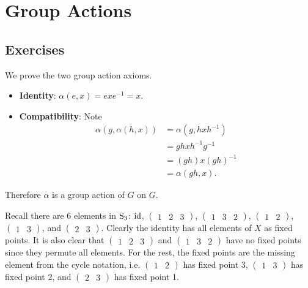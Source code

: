 \section{Group Actions}
\subsection*{Exercises}
\begin{questions}
    \item We prove the two group action axioms.
    \begin{itemize}
        \item \textbf{Identity}: $\alpha(e, x) = exe^{-1} = x$.
        \item \textbf{Compatibility}: Note
        \begin{align*}
            \alpha(g, \alpha(h, x)) &= \alpha(g, hxh^{-1})\\
            &= gh x h^{-1}g^{-1}\\
            &= (gh)x(gh)^{-1}\\
            &= \alpha(gh, x).
        \end{align*}
    \end{itemize}
    Therefore $\alpha$ is a group action of $G$ on $G$.

    \item Recall there are 6 elements in $\mathrm{S}_{3}$: $\mathrm{id}$, $\begin{pmatrix}1 & 2 & 3\end{pmatrix}$, $\begin{pmatrix}1 & 3 & 2\end{pmatrix}$, $\begin{pmatrix}1 & 2\end{pmatrix}$, $\begin{pmatrix}1 & 3\end{pmatrix}$, and $\begin{pmatrix}2 & 3\end{pmatrix}$. Clearly the identity has all elements of $X$ as fixed points. It is also clear that $\begin{pmatrix}1 & 2 & 3\end{pmatrix}$ and $\begin{pmatrix}1 & 3 & 2\end{pmatrix}$ have no fixed points since they permute all elements. For the rest, the fixed points are the missing element from the cycle notation, i.e. $\begin{pmatrix}1 & 2\end{pmatrix}$ has fixed point 3, $\begin{pmatrix}1 & 3\end{pmatrix}$ has fixed point 2, and $\begin{pmatrix}2 & 3\end{pmatrix}$ has fixed point 1.


\end{questions}
